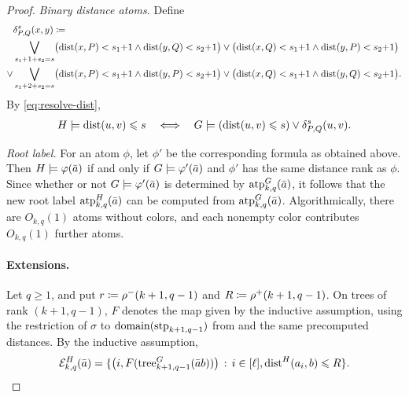 \begin{proof}
\emph{Binary distance atoms.}
Define
\begin{align*}
&\delta^s_{P,Q}(x,y)\coloneqq\\
&\bigvee_{s_1+1+s_2=s}\bigl(\mathrm{dist}(x,P)<s_1{+}1\land\mathrm{dist}(y,Q)<s_2{+}1\bigr)\lor\bigl(\mathrm{dist}(x,Q)<s_1{+}1\land\mathrm{dist}(y,P)<s_2{+}1\bigr)\\
\lor{}&\bigvee_{s_1+2+s_2=s}\bigl(\mathrm{dist}(x,P)<s_1{+}1\land\mathrm{dist}(y,P)<s_2{+}1\bigr)\lor\bigl(\mathrm{dist}(x,Q)<s_1{+}1\land\mathrm{dist}(y,Q)<s_2{+}1\bigr).
\end{align*}
By \eqref{eq:resolve-dist},
\begin{align}\label{eq:bin-dist}
H\models\mathrm{dist}(u,v)\leqslant s
\quad\Longleftrightarrow\quad
G\models(\mathrm{dist}(u,v)\leqslant s)\lor\delta^s_{P,Q}(u,v).
\end{align}



\emph{Root label.}
For an atom \(\phi\), let $\phi'$ be the corresponding formula as obtained above.
Then $H\models\varphi(\bar a)$ if and only if $G\models\varphi'(\bar a)$ and $\phi'$ has the same distance rank as $\phi$.
Since whether or not $G\models\varphi'(\bar a)$ is determined by $\textnormal{atp}^G_{k,q}(\bar a)$, it follows that the new root label $\textnormal{atp}^{H}_{k,q}(\bar a)$ can be computed  from $\textnormal{atp}^G_{k,q}(\bar a)$.
Algorithmically, there are $O_{k,q}(1)$ atoms without colors, and each nonempty color contributes $O_{k,q}(1)$ further atoms.


\paragraph{Extensions.}
Let $q\ge1$, and put $r\coloneqq\rho^-(k+1,q-1)$ and $R\coloneqq\rho^+(k+1,q-1)$.
On trees of rank $(k+1,q-1)$, $F$ denotes the map given by the inductive assumption, using the restriction of $\sigma$ to $\operatorname{domain}(\textnormal{stp}_{k+1,q-1})$ from  and the same precomputed distances.
By the inductive assumption,
\begin{align}\label{neqE}
\mathcal E^{H}_{k,q}(\bar a)=\{\bigl(i,F(\mathrm{tree}^G_{k+1,q-1}(\bar a b))\bigr) \,:\, i\in[\ell], \mathrm{dist}^H(a_i,b)\leqslant R \}.
\end{align}



\end{proof}
